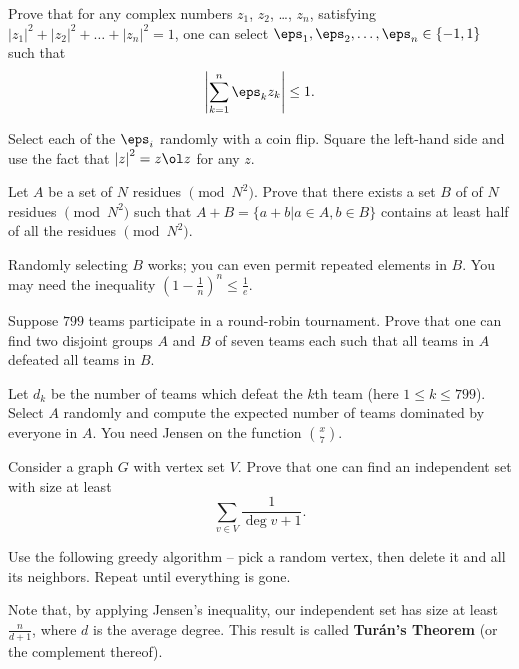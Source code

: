 \documentclass[11pt]{scrartcl}
\begin{document}
\begin{problem}
  [Romania 2004] Prove that for any complex numbers $z_1$, $z_2$, \dots, $z_n$, satisfying
  $\left\lvert z_1 \right\rvert^2 + \left\lvert z_2 \right\rvert^2 + \dots + \left\lvert z_n \right\rvert^2 = 1$,
  one can select $\eps_1, \eps_2, \dots, \eps_n \in \{-1,1\}$ such that
  \[ \left\lvert \sum_{k=1}^n \eps_k z_k \right\rvert \le 1. \]
  \begin{sketch}
    Select each of the $\eps_i$ randomly with a coin flip.
    Square the left-hand side and use the fact that $\left\lvert z \right\rvert^2 = z \ol z$ for any $z$.
  \end{sketch}
\end{problem}

\begin{problem}
  [Shortlist 1999 C4] Let $A$ be a set of $N$ residues $\pmod{N^{2}}$.
  Prove that there exists a set $B$ of of $N$ residues $\pmod{N^{2}}$ such that
  $A + B = \{a+b|a \in A, b \in B\}$ contains at least half of all the residues $\pmod{N^{2}}$.
  \begin{sketch}
    Randomly selecting $B$ works; you can even permit repeated elements in $B$.
    You may need the inequality $\left( 1 - \frac 1n \right)^n \le \frac 1e$.
  \end{sketch}
\end{problem}

\begin{problem}
   Suppose $799$ teams participate in a round-robin tournament.
  Prove that one can find two disjoint groups $A$ and $B$ of seven teams each
  such that all teams in $A$ defeated all teams in $B$.
  \begin{sketch}
    Let $d_k$ be the number of teams which defeat the $k$th team (here $1 \le k \le 799$).
    Select $A$ randomly and compute the expected number of teams dominated by everyone in $A$.
    You need Jensen on the function $\binom x7$.
  \end{sketch}
\end{problem}

\begin{problem}
   \label{thm:carowei}
  Consider a graph $G$ with vertex set $V$. Prove that one can find an independent set
  with size at least
  \[ \sum_{v \in V} \frac{1}{\deg v + 1}. \]
  \begin{sketch}
    Use the following greedy algorithm --
    pick a random vertex, then delete it and all its neighbors.
    Repeat until everything is gone.
  \end{sketch}
\end{problem}
\begin{remark*}
  Note that, by applying Jensen's inequality, our independent set has size at least $\frac{n}{d+1}$,
  where $d$ is the average degree.
  This result is called \textbf{Tur\'an's Theorem} (or the complement thereof).
\end{remark*}
\end{document}
